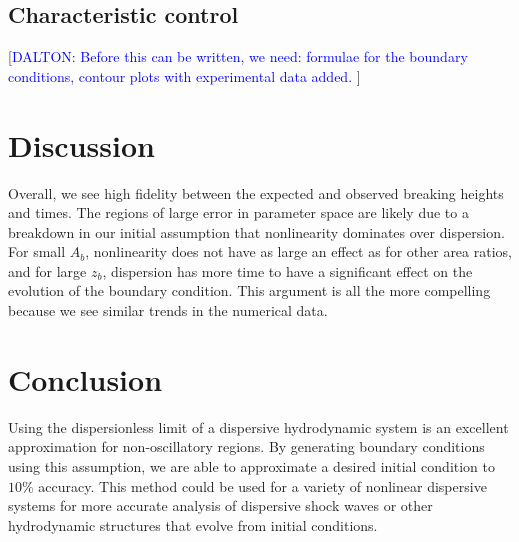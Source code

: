 \documentclass{jfm}
\newcommand{\MM}[1]{[\textcolor{blue}{#1 }]}
\begin{document}
\subsection{Characteristic control}
    \MM{DALTON: Before this can be written, we need: formulae for the boundary conditions, contour plots with experimental data added.}

\section{Discussion}\label{sec:Dis}
    Overall, we see high fidelity between the expected and observed breaking heights and times. The regions of large error in parameter space are likely due to a breakdown in our initial assumption that nonlinearity dominates over dispersion. For small $A_b$, nonlinearity does not have as large an effect as for other area ratios, and for large $z_b$, dispersion has more time to have a significant effect on the evolution of the boundary condition. This argument is all the more compelling because we see similar trends in the numerical data.

\section{Conclusion}\label{sec:Con}
    Using the dispersionless limit of a dispersive hydrodynamic system is an excellent approximation for non-oscillatory regions. By generating boundary conditions using this assumption, we are able to approximate a desired initial condition to $10\% $ accuracy. This method could be used for a variety of nonlinear dispersive systems for more accurate analysis of dispersive shock waves or other hydrodynamic structures that evolve from initial conditions.



\end{document}
